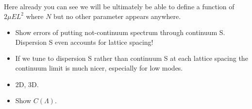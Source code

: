 Here already you can see we will be ultimately be able to define a function of $2\mu E L^2$ where $N$ but no other parameter appears anywhere.


\begin{itemize}
    \item Show errors of putting not-continuum spectrum through continuum S.  Dispersion S even accounts for lattice spacing!
    \item If we tune to dispersion S rather than continuum S at each lattice spacing the continuum limit is much nicer, especially for low modes.
    \item 2D, 3D.
    \item Show $C(\Lambda)$.
\end{itemize}
